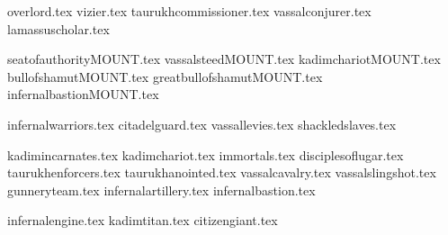 
{overlord.tex}
{vizier.tex}
{taurukhcommissioner.tex}
{vassalconjurer.tex}
{lamassuscholar.tex}

\clearpage
{}
{seatofauthorityMOUNT.tex}
{vassalsteedMOUNT.tex}
{kadimchariotMOUNT.tex}
{bullofshamutMOUNT.tex}
{greatbullofshamutMOUNT.tex}
{infernalbastionMOUNT.tex}

\clearpage
{}
{infernalwarriors.tex}
{citadelguard.tex}
{vassallevies.tex}
{shackledslaves.tex}

\clearpage
{}
{kadimincarnates.tex}
{kadimchariot.tex}
{immortals.tex}
{disciplesoflugar.tex}
{taurukhenforcers.tex}
{taurukhanointed.tex}
{vassalcavalry.tex}
{vassalslingshot.tex}
{gunneryteam.tex}
{infernalartillery.tex}
{infernalbastion.tex}

\clearpage
{}
{infernalengine.tex}
{kadimtitan.tex}
{citizengiant.tex}
